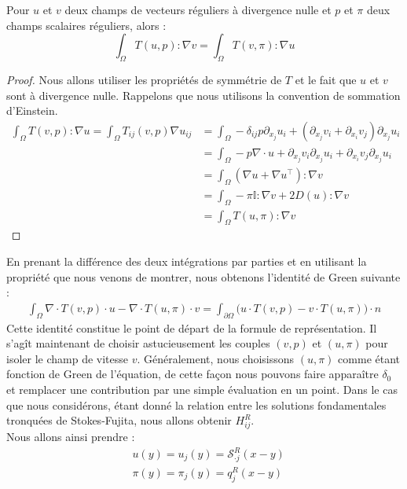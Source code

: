 \begin{propositionbox}
    \begin{proposition}
        Pour $u$ et $v$ deux champs de vecteurs réguliers à divergence nulle et $p$ et $\pi$ deux champs scalaires réguliers, alors :
        $$ \int_{\Omega} T(u,p) : \nabla v = \int_{\Omega} T(v,\pi) : \nabla u $$
    \end{proposition}
\end{propositionbox}
\begin{proof}
    Nous allons utiliser les propriétés de symmétrie de $T$ et le fait que $u$ et $v$ sont à divergence nulle. Rappelons que nous utilisons la convention de sommation d'Einstein.
    \begin{align*}
        \int_{\Omega} T(v,p) : \nabla u = \int_{\Omega} T_{ij}(v,p)\nabla u_{ij} &= \int_{\Omega} -\delta_{ij}p\partial_{x_j}u_i + (\partial_{x_j}v_i + \partial_{x_i}v_j)\partial_{x_j}u_i \\
        &= \int_{\Omega} - p \nabla \cdot u + \partial_{x_j}v_i \partial_{x_j} u_i + \partial_{x_i}v_j \partial_{x_j}u_i \\
        &= \int_{\Omega} (\nabla u + \nabla u^{\top} ) : \nabla v \\
        &=  \int_{\Omega} -\pi \mathbb{I} : \nabla v + 2 D(u) : \nabla v \\
        &= \int_{\Omega} T(u,\pi) : \nabla v
    \end{align*}
\end{proof}
En prenant la différence des deux intégrations par parties et en utilisant la propriété que nous venons de montrer, nous obtenons l'identité de Green suivante :
\begin{align*}
    \int_{\Omega}  \nabla \cdot T(v,p) \cdot u - \nabla \cdot T(u,\pi) \cdot v = \int_{\partial \Omega} \Big( u \cdot T(v,p) - v\cdot T(u,\pi) \Big) \cdot n
\end{align*}
Cette identité constitue le point de départ de la formule de représentation. Il s'agît maintenant de choisir astucieusement les couples $(v,p)$ et $(u,\pi)$ pour isoler le champ de vitesse $v$. Généralement, nous choisissons $(u,\pi)$ comme étant fonction de Green de l'équation, 
de cette façon nous pouvons faire apparaître $\delta_0$ et remplacer une contribution par une simple évaluation en un point. Dans le cas que nous considérons, étant donné la relation entre les solutions fondamentales tronquées de Stokes-Fujita, nous allons obtenir $H^R_{ij}$.\\
Nous allons ainsi prendre :
\begin{align*}
    & u(y) = u_j(y) = \mathscr{S}_{\cdot j}^R(x-y) \\
    & \pi(y) = \pi_j(y) = q_j^R(x-y)
\end{align*}
